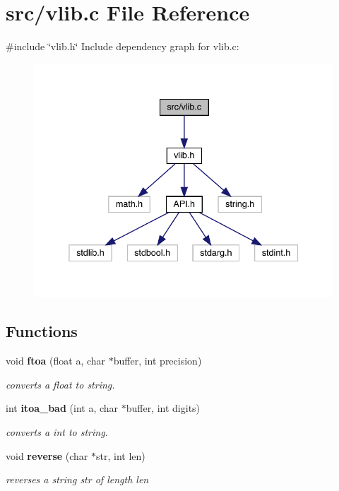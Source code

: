 \section{src/vlib.c File Reference}
\label{vlib_8c}
{\ttfamily \#include \char`\"{}vlib.\+h\char`\"{}}\newline
Include dependency graph for vlib.\+c\+:\nopagebreak
\begin{figure}[H]
\begin{center}
\leavevmode
\includegraphics[width=338pt]{vlib_8c__incl}
\end{center}
\end{figure}
\subsection*{Functions}
\begin{DoxyCompactItemize}
\item 
void \textbf{ ftoa} (float a, char $\ast$buffer, int precision)
\begin{DoxyCompactList}\small\item\em converts a float to string. \end{DoxyCompactList}\item 
int \textbf{ itoa\+\_\+bad} (int a, char $\ast$buffer, int digits)
\begin{DoxyCompactList}\small\item\em converts a int to string. \end{DoxyCompactList}\item 
void \textbf{ reverse} (char $\ast$str, int len)
\begin{DoxyCompactList}\small\item\em reverses a string \textquotesingle{}str\textquotesingle{} of length \textquotesingle{}len\textquotesingle{} \end{DoxyCompactList}\end{DoxyCompactItemize}


